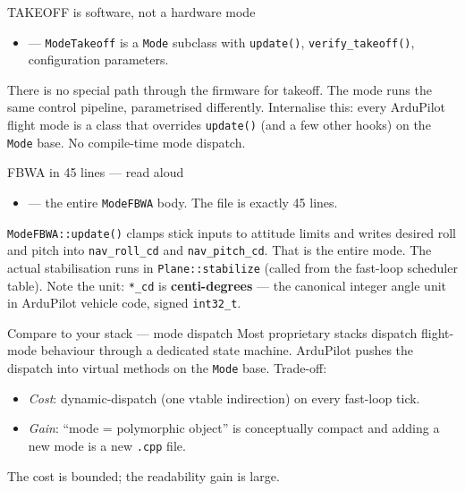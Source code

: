 \documentclass[aspectratio=169,11pt]{beamer}
\begin{document}
\begin{frame}{TAKEOFF is software, not a hardware mode}
  \begin{itemize}
    \item {} --- \texttt{ModeTakeoff} is a \texttt{Mode} subclass with \texttt{update()}, \texttt{verify\_takeoff()}, configuration parameters.
  \end{itemize}
  \vfill
  There is no special path through the firmware for takeoff. The mode runs the same control pipeline, parametrised differently.
  \vfill
  Internalise this: every ArduPilot flight mode is a class that overrides \texttt{update()} (and a few other hooks) on the \texttt{Mode} base. No compile-time mode dispatch.
\end{frame}

\begin{frame}[allowframebreaks]{FBWA in 45 lines --- read aloud}
  \begin{itemize}
    \item {} --- the entire \texttt{ModeFBWA} body. The file is exactly 45 lines.
  \end{itemize}
  \vfill
  \texttt{ModeFBWA::update()} clamps stick inputs to attitude limits and writes desired roll and pitch into \texttt{nav\_roll\_cd} and \texttt{nav\_pitch\_cd}. That is the entire mode. The actual stabilisation runs in \texttt{Plane::stabilize} (called from the fast-loop scheduler table).
  \vfill
  Note the unit: \texttt{*\_cd} is \textbf{centi-degrees} --- the canonical integer angle unit in ArduPilot vehicle code, signed \texttt{int32\_t}.
\end{frame}

\begin{frame}{Compare to your stack --- mode dispatch}
  Most proprietary stacks dispatch flight-mode behaviour through a dedicated state machine.
  \vfill
  ArduPilot pushes the dispatch into virtual methods on the \texttt{Mode} base.
  \vfill
  Trade-off:
  \begin{itemize}
    \item \emph{Cost}: dynamic-dispatch (one vtable indirection) on every fast-loop tick.
    \item \emph{Gain}: ``mode = polymorphic object'' is conceptually compact and adding a new mode is a new \texttt{.cpp} file.
  \end{itemize}
  \vfill
  The cost is bounded; the readability gain is large.
\end{frame}
\end{document}
